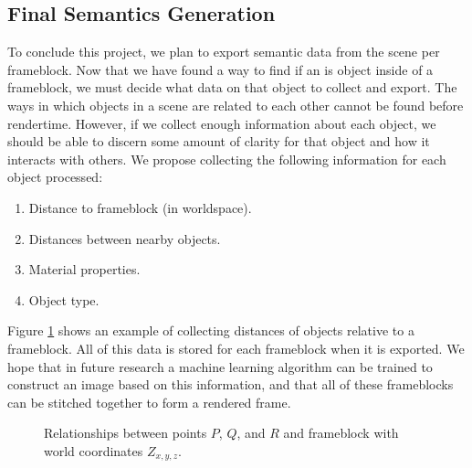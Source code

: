 \documentclass[conference]{IEEEtran}
\begin{document}
\subsection{Final Semantics Generation}
To conclude this project, we plan to export semantic data from the scene per frameblock.
Now that we have found a way to find if an is object inside of a frameblock,
we must decide what data on that object to collect and export.
The ways in which objects in a scene are related to each other cannot be found before rendertime.
However, if we collect enough information about each object, we should be able to discern some amount of clarity
for that object and how it interacts with others.
We propose collecting the following information for each object processed:
\bigskip
\begin{enumerate}
\item Distance to frameblock (in worldspace).
\item Distances between nearby objects.
\item Material properties.
\item Object type.
\end{enumerate}
\bigskip

Figure \ref{fig:distances} shows an example of collecting distances of objects relative to a frameblock.
All of this data is stored for each frameblock when it is exported.
We hope that in future research a machine learning algorithm can be trained to construct an image based on this information,
and that all of these frameblocks can be stitched together to form a rendered frame.

\begin{adjustwidth}{2.5em}{0pt}
\begin{figure}[h!]
\begin{center}
\end{center}
\caption{Relationships between points $P$, $Q$, and $R$ and frameblock with world coordinates $Z_{x,y,z}$.}
\label{fig:distances}
\end{figure}
\end{adjustwidth}
\end{document}
